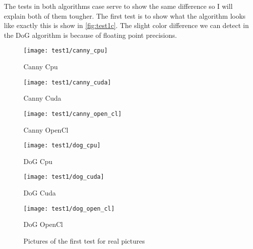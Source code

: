 The tests in both algorithms case serve to show the same difference so I will explain both of them tougher. The first test is to show what the algorithm looks like exactly this is show in \autoref{fig:test1c}. The slight color difference we can detect in the \ac{DoG} algorithm is because of floating point precisions.


\begin{figure}[H]
\centering
\begin{minipage}[t]{.325\textwidth}
\centering
\texttt{[image: test1/canny\_cpu]}
\addtocounter{figure}{-1}
\captionsetup{labelformat=empty}
\caption[]{Canny Cpu}
\end{minipage}
\begin{minipage}[t]{.325\textwidth}
\centering
\texttt{[image: test1/canny\_cuda]}
\addtocounter{figure}{-1}
\captionsetup{labelformat=empty}
\caption[]{Canny Cuda}
\end{minipage}
\begin{minipage}[t]{.325\textwidth}
\centering
\texttt{[image: test1/canny\_open\_cl]}
\addtocounter{figure}{-1}
\captionsetup{labelformat=empty}
\caption[]{Canny OpenCl}
\end{minipage}
\begin{minipage}[t]{.325\textwidth}
\centering
\texttt{[image: test1/dog\_cpu]}
\addtocounter{figure}{-1}
\captionsetup{labelformat=empty}
\caption[]{DoG Cpu}
\end{minipage}
\begin{minipage}[t]{.325\textwidth}
\centering
\texttt{[image: test1/dog\_cuda]}
\addtocounter{figure}{-1}
\captionsetup{labelformat=empty}
\caption[]{DoG Cuda}
\end{minipage}
\begin{minipage}[t]{.325\textwidth}
\centering
\texttt{[image: test1/dog\_open\_cl]}
\addtocounter{figure}{-1}
\captionsetup{labelformat=empty}
\caption[]{DoG OpenCl}
\end{minipage}
\caption{Pictures of the first test for real pictures}
\label{fig:test1c}
\end{figure}


